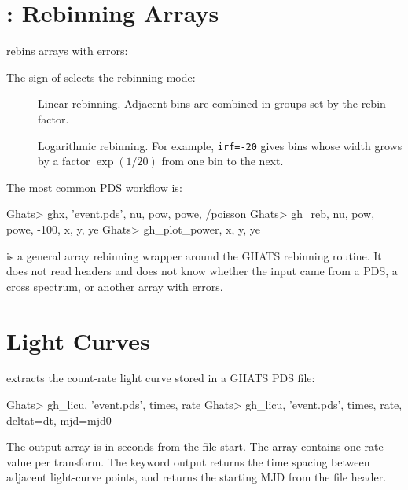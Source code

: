 \section{: Rebinning Arrays}

 rebins arrays with errors:


The sign of  selects the rebinning mode:

\begin{description}
\item[] Linear rebinning.  Adjacent bins are combined in
  groups set by the rebin factor.
\item[] Logarithmic rebinning.  For example, \texttt{irf=-20}
  gives bins whose width grows by a factor \(\exp(1/20)\) from one bin to the
  next.
\end{description}

The most common PDS workflow is:

\begin{ghatsconsole}
Ghats> ghx, 'event.pds', nu, pow, powe, /poisson
Ghats> gh_reb, nu, pow, powe, -100, x, y, ye
Ghats> gh_plot_power, x, y, ye
\end{ghatsconsole}

 is a general array rebinning wrapper around the GHATS
rebinning routine.  It does not read headers and does not know whether the
input came from a PDS, a cross spectrum, or another array with errors.

\section{Light Curves}

 extracts the count-rate light curve stored in a GHATS PDS
file:

\begin{ghatsconsole}
Ghats> gh_licu, 'event.pds', times, rate
Ghats> gh_licu, 'event.pds', times, rate, deltat=dt, mjd=mjd0
\end{ghatsconsole}

The output  array is in seconds from the file start.  The
 array contains one rate value per transform.  The keyword output
 returns the time spacing between adjacent light-curve points,
and  returns the starting MJD from the file header.

